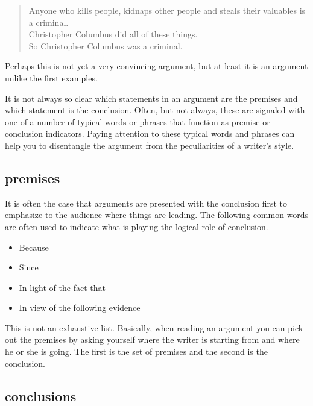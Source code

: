 \documentclass[justified]{tufte-book}
\providecommand{\tightlist}{%
  \setlength{\itemsep}{0pt}\setlength{\parskip}{0pt}}
\newenvironment{argument}{\begin{quote}\normalsize}{\end{quote}}
\begin{document}
\begin{argument}
Anyone who kills people, kidnaps other people and steals their valuables
is a criminal.\\
Christopher Columbus did all of these things.\\
So Christopher Columbus was a criminal.
\end{argument}

Perhaps this is not yet a very convincing argument, but at least it is an argument unlike the first examples.

It is not always so clear which statements in an argument are the premises and which statement is the conclusion. Often, but not always, these are signaled with one of a number of typical words or phrases that function as premise or conclusion indicators. Paying attention to these typical words and phrases can help you to disentangle the argument from the peculiarities of a writer's style.

\hypertarget{premises}{%
\subsection*{premises}\label{premises}}

It is often the case that arguments are presented with the conclusion first to emphasize to the audience where things are leading. The following common words are often used to indicate what is playing the logical role of conclusion.

\begin{itemize}
\tightlist
\item
  Because
\item
  Since
\item
  In light of the fact that
\item
  In view of the following evidence
\end{itemize}

This is not an exhaustive list. Basically, when reading an argument you can pick out the premises by asking yourself where the writer is starting from and where he or she is going. The first is the set of premises and the second is the conclusion.

\hypertarget{conclusions}{%
\subsection*{conclusions}\label{conclusions}}
\end{document}
